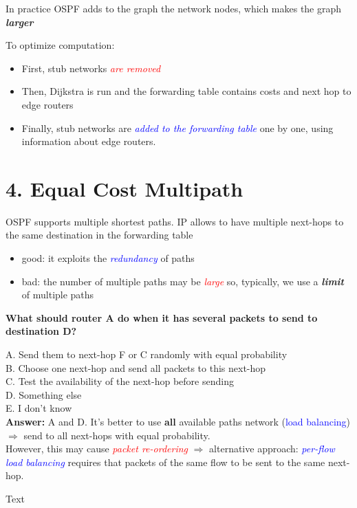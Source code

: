 \documentclass[11pt]{article}
\begin{document}
In practice OSPF adds to the graph the network nodes, which makes the graph \textbf{\textit{larger}}

To optimize computation:
\begin{itemize}
	\item First, stub networks \textcolor{red}{\textit{are removed}}
	\item Then, Dijkstra is run and the forwarding table contains costs and next hop to edge routers
	\item Finally, stub networks are \textcolor{blue}{\textit{added to the forwarding table}} one by one, using information about edge routers.
\end{itemize}

\section*{4. Equal Cost Multipath}

OSPF supports multiple shortest paths. IP allows to have multiple next-hops to the same destination in the forwarding table
\begin{itemize}
	\item good: it exploits the \textcolor{blue}{\textit{redundancy}} of paths
	\item bad: the number of multiple paths may be \textcolor{red}{\textit{large}} so, typically, we use a \textbf{\textit{limit}} of multiple paths
\end{itemize}

\begin{tcolorbox}[
  colback=gray!15,     %
  colframe=black!50,    %
  boxrule=1pt,       %
  arc=3mm,             %
  left=4mm, right=4mm, top=2mm, bottom=2mm %
]
\textbf{What should router A do when it has several packets to send to destination D?}

A. Send them to next-hop F or C randomly with equal probability \\
B. Choose one next-hop and send all packets to this next-hop \\
C. Test the availability of the next-hop before sending \\
D. Something else \\
E. I don't know \\

\textbf{Answer:} A and D. It's better to use \textbf{all} available paths network (\textcolor{blue}{load balancing}) $\Rightarrow$ send to all next-hops with equal probability. \\

However, this may cause \textcolor{red}{\textit{packet re-ordering}} $\Rightarrow$ alternative approach: \textcolor{blue}{\textit{per-flow load balancing}} requires that packets of the same flow to be sent to the same next-hop. 

\vspace{0.3cm}

Text
\end{tcolorbox}
\end{document}

